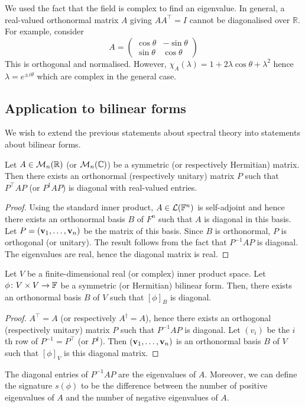 \documentclass[a4paper,11pt]{article}
\begin{document}
\begin{remark}
	We used the fact that the field is complex to find an eigenvalue.
	In general, a real-valued orthonormal matrix \( A \) giving \( A A^\top = I \) cannot be diagonalised over \( \mathbb R \).
	For example, consider
	\[
		A = \begin{pmatrix}
			\cos\theta & -\sin\theta \\
			\sin\theta & \cos\theta
		\end{pmatrix}
	\]
	This is orthogonal and normalised.
	However, \( \chi_A(\lambda) = 1 + 2\lambda \cos\theta + \lambda^2 \) hence \( \lambda = e^{\pm i \theta} \) which are complex in the general case.
\end{remark}

\subsection{Application to bilinear forms}
We wish to extend the previous statements about spectral theory into statements about bilinear forms.
\begin{corollary}
	Let \( A \in {\mathcal{M}}_n(\mathbb R) \) (or \( {\mathcal{M}}_n(\mathbb C) \)) be a symmetric (or respectively Hermitian) matrix.
	Then there exists an orthonormal (respectively unitary) matrix \( P \) such that \( P^\top A P \) (or \( P^\dagger A P \)) is diagonal with real-valued entries.
\end{corollary}
\begin{proof}
	Using the standard inner product, \( A \in {\mathcal{L}}({\mathbb{F}}^n) \) is self-adjoint and hence there exists an orthonormal basis \( B \) of \( F^n \) such that \( A \) is diagonal in this basis.
	Let \( P = ({\bf v}_1, \dots, {\bf v}_n) \) be the matrix of this basis.
	Since \( B \) is orthonormal, \( P \) is orthogonal (or unitary).
	The result follows from the fact that \( P^{-1} A P \) is diagonal.
	The eigenvalues are real, hence the diagonal matrix is real.
\end{proof}
\begin{corollary}
	Let \( V \) be a finite-dimensional real (or complex) inner product space.
	Let \( \phi \colon V \times V \to {\mathbb{F}} \) be a symmetric (or Hermitian) bilinear form.
	Then, there exists an orthonormal basis \( B \) of \( V \) such that \( [\phi]_B \) is diagonal.
\end{corollary}
\begin{proof}
	\( A^\top = A \) (or respectively \( A^\dagger = A \)), hence there exists an orthogonal (respectively unitary) matrix \( P \) such that \( P^{-1} A P \) is diagonal.
	Let \( (v_i) \) be the \( i \)th row of \( P^{-1} = P^\top \) (or \( P^\dagger \)).
	Then \( ({\bf v}_1, \dots, {\bf v}_n) \) is an orthonormal basis \( B \) of \( V \) such that \( [\phi]_V \) is this diagonal matrix.
\end{proof}
\begin{remark}
	The diagonal entries of \( P^{-1} A P \) are the eigenvalues of \( A \).
	Moreover, we can define the signature \( s(\phi) \) to be the difference between the number of positive eigenvalues of \( A \) and the number of negative eigenvalues of \( A \).
\end{remark}
\end{document}
